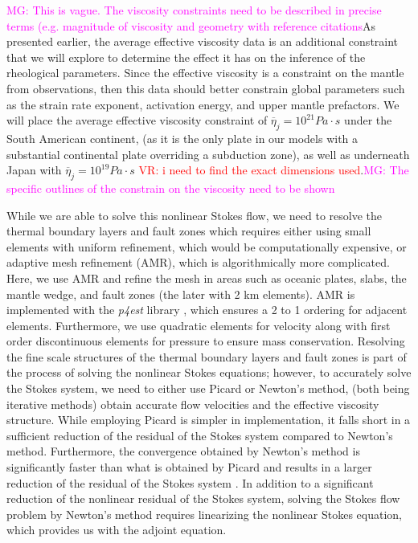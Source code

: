 \documentclass[12pt]{article}
\newcommand{\mgnote}[1]{\textcolor{magenta}{MG: #1}}
\newcommand{\vrnote}[1]{\textcolor{red}{VR: #1}}
\begin{document}
{\mgnote{This is vague. The viscosity constraints need to be described in precise terms (e.g. magnitude of viscosity and geometry with reference citations}As presented earlier, the average effective viscosity data is an additional constraint that we will explore to determine the effect it has on the inference of the rheological parameters. Since the effective viscosity is a constraint on the mantle from observations, then this data should better constrain global parameters such as the strain rate exponent, activation energy, and upper mantle prefactors. We will place the average effective viscosity constraint of $\overline{\eta}_j = 10^{21} Pa\cdot s$ under the South American continent, (as it is the only plate in our models with a substantial continental plate overriding a subduction zone), as well as underneath Japan with $\overline{\eta}_j = 10^{19} Pa\cdot s$ \citep{hu2016asthenosphere} \vrnote{i need to find the exact dimensions used}.\mgnote{The specific outlines of the constrain on the viscosity need to be shown}
 
While we are able to solve this nonlinear Stokes flow, we need to resolve the thermal boundary layers and fault zones which requires either using small elements with uniform refinement, which would be computationally expensive, or adaptive mesh refinement (AMR), which is algorithmically more complicated. 
Here, we use AMR and refine the mesh in areas such as oceanic plates, slabs, the mantle wedge, and fault zones (the later with 2 km elements). AMR is implemented with the \textit{p4est} library \citep{burstedde2011p4est}, which ensures a 2 to 1 ordering for adjacent elements. Furthermore, we use quadratic elements for velocity along with first order discontinuous elements for pressure to ensure mass conservation.
  Resolving the fine scale structures of the thermal boundary layers and fault zones is part of the process of solving the nonlinear Stokes equations; however, to accurately solve the Stokes system, we need to either use Picard or Newton's method, (both being iterative methods) obtain accurate flow velocities and the effective viscosity structure. While employing Picard is simpler in implementation, it falls short in a sufficient reduction of the residual of the Stokes system compared to Newton's method. Furthermore, the convergence obtained by Newton's method is significantly faster than what is obtained by Picard and results in a larger reduction of the residual of the Stokes system \citep{rudi2015extreme}. In addition to a significant reduction of the nonlinear residual of the Stokes system, solving the Stokes flow problem by Newton's method requires linearizing the nonlinear Stokes equation, which provides us with the adjoint equation. 

}
\end{document}
